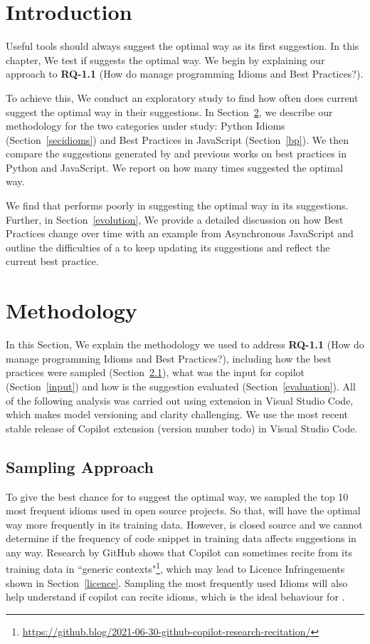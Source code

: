 \label{chapter:idioms}

\section{Introduction}
Useful \AISE{} tools should always suggest the optimal way as its first suggestion. In this chapter, We test if \cop{} suggests the optimal way. 
We begin by explaining our approach to \textbf{RQ-1.1} (How do \cct{} manage programming Idioms and Best Practices?). 

To achieve this, We conduct an exploratory study to find how often does current \cct{} suggest the optimal way in their suggestions. In Section~\ref{methodology}, we describe our methodology for the two categories under study: Python Idioms (Section~\ref{secidioms}) and Best Practices in JavaScript (Section~\ref{bp}).
We then compare the suggestions generated by \cop{} and previous works on best practices in Python and JavaScript. We report on how many times \cop{} suggested the optimal way. 

We find that \cop{} performs poorly in suggesting the optimal way in its suggestions. Further, in Section~\ref{evolution}, We provide a detailed discussion on how Best Practices change over time with an example from Asynchronous JavaScript and outline the difficulties of a \cct{} to keep updating its suggestions and reflect the current best practice.

\section{Methodology}
\label{methodology}
In this Section, We explain the methodology we used to address \textbf{RQ-1.1} (How do \cct{} manage programming Idioms and Best Practices?), including how the best practices were sampled (Section~\ref{sampling}), what was the input for copilot (Section~\ref{input}) and how is the suggestion evaluated (Section~\ref{evaluation}). All of the following analysis was carried out using \cop{} extension in Visual Studio Code, which makes \cop{} model versioning and clarity challenging. We use the most recent stable release of Copilot extension (version number todo) in Visual Studio Code.

\subsection{Sampling Approach}
\label{sampling}
To give the best chance for \cop{} to suggest the optimal way, we sampled the top 10 most frequent idioms used in open source projects. So that, \cop{} will have the optimal way more frequently in its training data. However, \cop{} is closed source and we cannot determine if the frequency of code snippet in training data affects \cop{} suggestions in any way. Research by GitHub shows that Copilot can sometimes recite from its training data in ``generic contexts"\footnote{\url{https://github.blog/2021-06-30-github-copilot-research-recitation/}}, which may lead to Licence Infringements shown in Section~\ref{licence}. Sampling the most frequently used Idioms will also help understand if copilot can recite idioms, which is the ideal behaviour for \cct{}.

